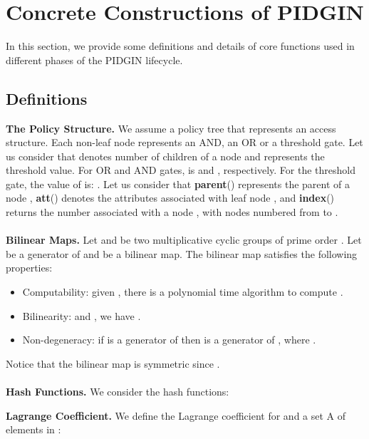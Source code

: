\documentclass[epsfig,a4paper,11pt,titlepage]{book}
\numberwithin{algorithm}{chapter}
\begin{document}
\section[Concrete Constructions of PIDGIN]{Concrete Constructions of \gls{PIDGIN}}
\label{sec:pidgin-construction}







In this section, we provide some definitions and details of core functions used in different phases of the \gls{PIDGIN} lifecycle.



\subsection{Definitions}

\noindent \textbf{The Policy Structure.} We assume a policy tree  that represents an access structure. Each non-leaf node represents an AND, an OR or a threshold gate. Let us consider that  denotes number of children of a node  and  represents the threshold value. For OR and AND gates,  is  and , respectively. For the threshold gate, the value of  is: . Let us consider that \textbf{parent}() represents the parent of a node , \textbf{att}() denotes the attributes associated with leaf node , and \textbf{index}() returns the number associated with a node , with nodes numbered from  to . \\ \\
\textbf{Bilinear Maps.} Let  and  be two multiplicative cyclic groups of prime order . Let  be a generator of  and  be a bilinear map. The bilinear map  satisfies the following properties:

\begin{itemize}
	\item Computability: given , there is a polynomial time algorithm to compute .
	\item Bilinearity:  and , we have .
	\item Non-degeneracy: if  is a generator of  then  is a generator of , where .
\end{itemize}
Notice that the bilinear map  is symmetric since . \\ \\
\textbf{Hash Functions.} We consider the hash functions: 



\noindent \textbf{Lagrange Coefficient.} We define the Lagrange coefficient  for  and a set A of elements in : 
\end{document}
